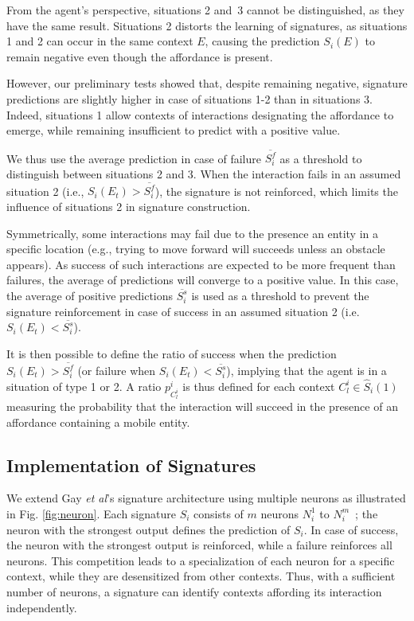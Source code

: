 \documentclass[conference]{IEEEtran}
\makeatletter
\let\cite\relax
\DeclareRobustCommand{\cite}{%
	\let\new@cite@pre\@gobble
	\@ifnextchar[\new@cite{\@citex[]}}
\def\new@cite[#1]{\@ifnextchar[{\new@citea{#1}}{\@citex[#1]}}
\def\new@citea#1{\def\new@cite@pre{#1}\@citex}
\makeatother
\begin{document}
From the agent's perspective, situations 2 and~3 cannot be distinguished, as they have the same result.
Situations 2 distorts the learning of signatures, as situations 1 and 2 can occur in the same context $E$, causing the prediction $S_i(E)$ to remain negative even though the affordance is present.


However, our preliminary tests showed that, despite remaining negative, signature predictions are slightly higher in case of situations 1-2 than in situations 3. Indeed, situations 1 allow contexts of interactions designating the affordance to emerge, while remaining insufficient to predict with a positive value.

We thus use the average prediction in case of failure $\overline{S_i^f}$ as a threshold to distinguish between situations 2 and 3.
When the interaction fails in an assumed situation 2 (i.e., $S_i(E_t)>\overline{S_i^f}$), the signature is not reinforced, which limits the influence of situations 2 in signature construction.


Symmetrically, some interactions may fail due to the presence an entity in a specific location (e.g., trying to move forward will succeeds unless an obstacle appears).
As success of such interactions are expected to be more frequent than failures, the average of predictions will converge to a positive value.
In this case, the average of positive predictions $\overline{S_i^s}$ is used as a threshold to prevent the signature reinforcement in case of success in an assumed situation 2 (i.e. $S_i(E_t)<\overline{S_i^s}$).


It is then possible to define the ratio of success when the prediction $S_i(E_t)>\overline{S_i^f}$ (or failure when $S_i(E_t)<\overline{S_i^s}$), implying that the agent is in a situation of type 1 or 2. A ratio $p_{C_l^i}^i$ is thus defined for each context $C_l^i \in \hat{S}_i(1)$ measuring the probability that the interaction will succeed in the presence of an affordance containing a mobile entity.



\subsection{Implementation of Signatures}\label{contexts}


We extend Gay \textit{et al}'s signature architecture \cite{gay:space} using multiple neurons as illustrated in Fig. \ref{fig:neuron}. 
Each signature $S_i$ consists of $m$ neurons $N_i^1$ to $N_i^m$~; the neuron with the strongest output defines the prediction of $S_i$. 
In case of success, the neuron with the strongest output is reinforced, while a failure reinforces all neurons. 
This competition leads to a specialization of each neuron for a specific context, while they are desensitized from other contexts. Thus, with a sufficient number of neurons, a signature can identify contexts affording its interaction independently.
\end{document}
